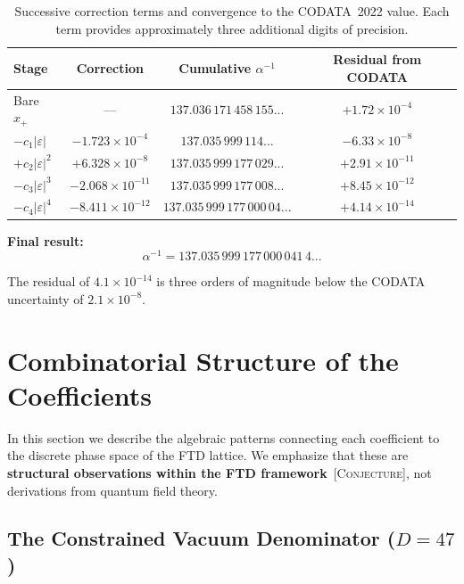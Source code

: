 \documentclass[11pt,twoside]{article}
\theoremstyle{remark}
\newcommand{\etag}[1]{\textsc{\small[#1]}}
\newcommand{\conj}{\etag{Conjecture}}
\newcommand{\eps}{\varepsilon}
\newcommand{\xp}{x_{+}}
\newcommand{\inv}{\alpha^{-1}}
\begin{document}
\begin{table}[H]
    \centering
    \caption{Successive correction terms and convergence to the CODATA~2022 value.
    Each term provides approximately three additional digits of precision.}
    \label{tab:convergence}
    \begin{tabular}{@{}lccc@{}}
        \toprule
        \textbf{Stage} & \textbf{Correction} & \textbf{Cumulative $\inv$} & \textbf{Residual from CODATA} \\
        \midrule
        Bare $\xp$ & --- & $137.036\,171\,458\,155...$ & $+1.72 \times 10^{-4}$ \\[3pt]
        $-c_1|\eps|$ & $-1.723 \times 10^{-4}$ & $137.035\,999\,114...$ & $-6.33 \times 10^{-8}$ \\[3pt]
        $+c_2|\eps|^2$ & $+6.328 \times 10^{-8}$ & $137.035\,999\,177\,029...$ & $+2.91 \times 10^{-11}$ \\[3pt]
        $-c_3|\eps|^3$ & $-2.068 \times 10^{-11}$ & $137.035\,999\,177\,008...$ & $+8.45 \times 10^{-12}$ \\[3pt]
        $-c_4|\eps|^4$ & $-8.411 \times 10^{-12}$ & $137.035\,999\,177\,000\,04...$ & $+4.14 \times 10^{-14}$ \\
        \bottomrule
    \end{tabular}
\end{table}

\noindent\textbf{Final result:}
\begin{equation}
\label{eq:result}
    \inv = 137.035\,999\,177\,000\,041\,4...
\end{equation}

The residual of $4.1 \times 10^{-14}$ is three orders of magnitude below the CODATA uncertainty of $2.1 \times 10^{-8}$.


\section{Combinatorial Structure of the Coefficients}
\label{sec:combinatorics}

In this section we describe the algebraic patterns connecting each coefficient to the discrete phase space of the FTD lattice.
We emphasize that these are \textbf{structural observations within the FTD framework}~\conj, not derivations from quantum field theory.

\subsection{The Constrained Vacuum Denominator ($D = 47$)}
\label{sec:D47}
\end{document}

